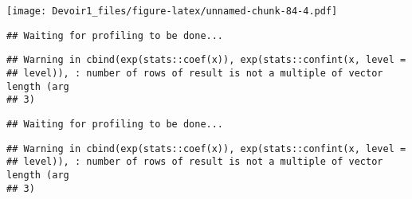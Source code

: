 \documentclass[]{article}
\newenvironment{Shaded}{\begin{snugshade}}{\end{snugshade}}
\newcommand{\KeywordTok}[1]{\textcolor[rgb]{0.13,0.29,0.53}{\textbf{#1}}}
\newcommand{\DataTypeTok}[1]{\textcolor[rgb]{0.13,0.29,0.53}{#1}}
\newcommand{\DecValTok}[1]{\textcolor[rgb]{0.00,0.00,0.81}{#1}}
\newcommand{\StringTok}[1]{\textcolor[rgb]{0.31,0.60,0.02}{#1}}
\newcommand{\OperatorTok}[1]{\textcolor[rgb]{0.81,0.36,0.00}{\textbf{#1}}}
\newcommand{\NormalTok}[1]{#1}
\begin{document}
\texttt{[image: Devoir1\_files/figure-latex/unnamed-chunk-84-4.pdf]}

\begin{Shaded}
\end{Shaded}

\begin{verbatim}
## Waiting for profiling to be done...
\end{verbatim}

\begin{verbatim}
## Warning in cbind(exp(stats::coef(x)), exp(stats::confint(x, level =
## level)), : number of rows of result is not a multiple of vector length (arg
## 3)
\end{verbatim}

\begin{verbatim}
## Waiting for profiling to be done...
\end{verbatim}

\begin{verbatim}
## Warning in cbind(exp(stats::coef(x)), exp(stats::confint(x, level =
## level)), : number of rows of result is not a multiple of vector length (arg
## 3)
\end{verbatim}
\end{document}
